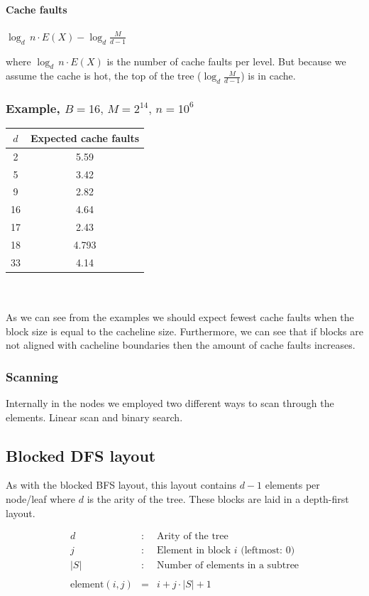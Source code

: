 \paragraph*{Cache faults}

$\log_{d}\, n\cdot E(X)-\log_{d}\frac{M}{d-1}$

where $\log_{d}\, n\cdot E(X)$ is the number of cache faults per level. But because we assume the cache is hot, the top of the tree ($\log_{d}\frac{M}{d-1}$) is in cache.

\subsubsection*{Example, $B=16,\, M=2^{14},\, n=10^{6}$}

\begin{tabular}{|c|c|}
\hline 
$d$ & Expected cache faults\tabularnewline
\hline 
\hline 
2 & 5.59\tabularnewline
\hline 
5 & 3.42\tabularnewline
\hline 
9 & 2.82\tabularnewline
\hline 
16 & 4.64\tabularnewline
\hline 
17 & 2.43\tabularnewline
\hline 
18 & 4.793\tabularnewline
\hline 
33 & 4.14\tabularnewline
\hline 
\end{tabular}
\\
\\
As we can see from the examples we should expect fewest cache faults when the block size is equal to the cacheline size. Furthermore, we can see that if blocks are not aligned with cacheline boundaries then the amount of cache faults increases.

\subsubsection*{Scanning}

Internally in the nodes we employed two different ways to scan through the elements. Linear scan and binary search.


\subsection{Blocked DFS layout}

As with the blocked BFS layout, this layout contains $d - 1$ elements per node/leaf where $d$ is the arity of the tree. These blocks are laid in a depth-first layout.

\begin{eqnarray*}
d & : & \textrm{Arity of the tree} \\
j & : & \textrm{Element in block $i$ (leftmost: $0$)} \\
|S| & : & \textrm{Number of elements in a subtree} \\
\\
\mathrm{element}(i, j) & = & i + j\cdot |S| + 1
\end{eqnarray*}

